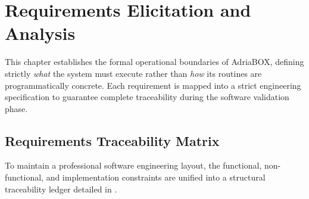 \section{Requirements Elicitation and Analysis}
\label{sec:requirements}

This chapter establishes the formal operational boundaries of AdriaBOX, defining strictly \textit{what} the system must execute rather than \textit{how} its routines are programmatically concrete. Each requirement is mapped into a strict engineering specification to guarantee complete traceability during the software validation phase.

\subsection{Requirements Traceability Matrix}
To maintain a professional software engineering layout, the functional, non-functional, and implementation constraints are unified into a structural traceability ledger detailed in .

